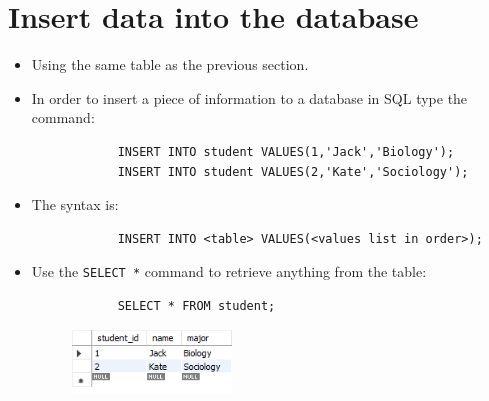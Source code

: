 \section{Insert data into the database}
\begin{itemize}
    \item Using the same table as the previous section.
    \item In order to insert a piece of information to a database in SQL type the command:
        \begin{verbatim}
            INSERT INTO student VALUES(1,'Jack','Biology');
            INSERT INTO student VALUES(2,'Kate','Sociology');
        \end{verbatim}
    
    \item The syntax is:
        \begin{verbatim}
            INSERT INTO <table> VALUES(<values list in order>);
        \end{verbatim}
    
    \item Use the \texttt{SELECT *} command to retrieve anything from the table:
        \begin{verbatim}
            SELECT * FROM student;
        \end{verbatim}
        \begin{figure}[H]
            \centering
            \includegraphics[width=0.4\textwidth]{./figs/insert1.png}
        \end{figure}
    

\end{itemize}
